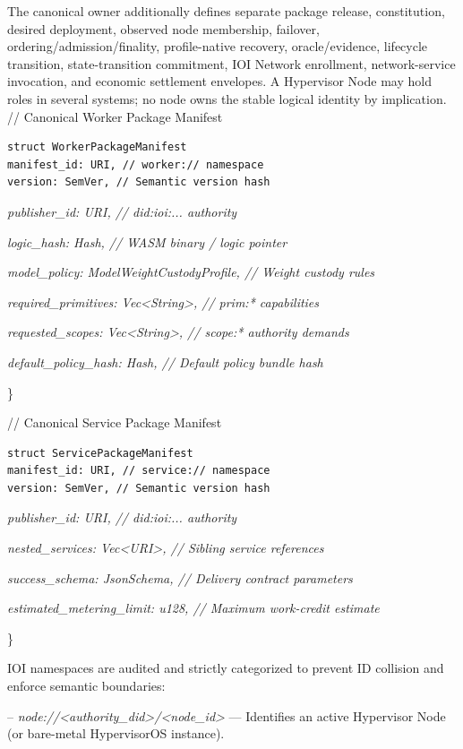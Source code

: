 \documentclass[
  11pt,
]{article}
\begin{document}
The canonical owner additionally defines separate package release,
constitution, desired deployment, observed node membership, failover,
ordering/admission/finality, profile-native recovery, oracle/evidence,
lifecycle transition, state-transition commitment, IOI Network enrollment,
network-service invocation, and economic settlement envelopes.
A Hypervisor Node may hold roles in several systems; no node owns the stable
logical identity by implication.
// Canonical Worker Package Manifest

\begin{lstlisting}[language=rustioi]
struct WorkerPackageManifest
manifest_id: URI, // worker:// namespace
version: SemVer, // Semantic version hash
\end{lstlisting}
\emph{publisher\_id: URI, // did:ioi:... authority}

\emph{logic\_hash: Hash, // WASM binary / logic pointer}

\emph{model\_policy: ModelWeightCustodyProfile, // Weight custody rules}

\emph{required\_primitives: Vec\textless String\textgreater, // prim:*
capabilities}

\emph{requested\_scopes: Vec\textless String\textgreater, // scope:*
authority demands}

\emph{default\_policy\_hash: Hash, // Default policy bundle hash}

\}

// Canonical Service Package Manifest

\begin{lstlisting}[language=rustioi]
struct ServicePackageManifest
manifest_id: URI, // service:// namespace
version: SemVer, // Semantic version hash
\end{lstlisting}
\emph{publisher\_id: URI, // did:ioi:... authority}

\emph{nested\_services: Vec\textless URI\textgreater, // Sibling service
references}

\emph{success\_schema: JsonSchema, // Delivery contract parameters}

\emph{estimated\_metering\_limit: u128, // Maximum work-credit estimate}

\}

IOI namespaces are audited and strictly categorized to prevent ID
collision and enforce semantic boundaries:

--
\emph{node://\textless authority\_did\textgreater/\textless node\_id\textgreater{}}
--- Identifies an active Hypervisor Node (or bare-metal HypervisorOS
instance).
\end{document}
